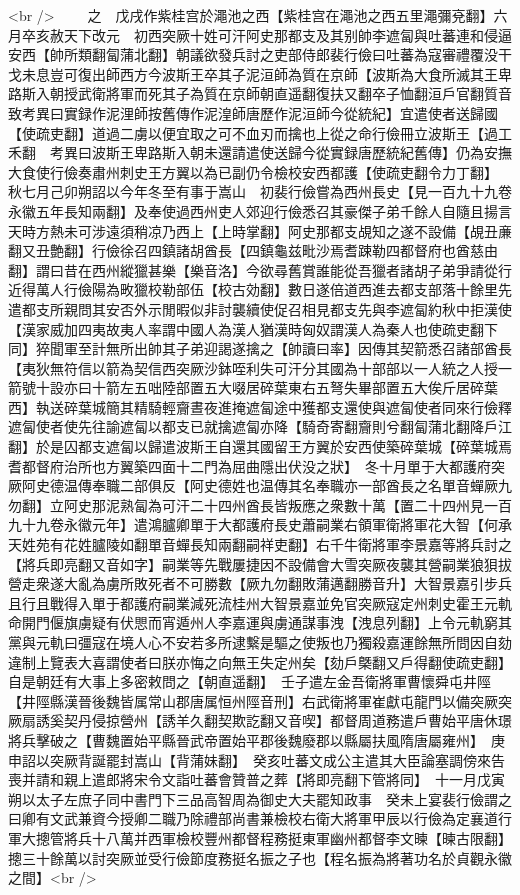 <br />
　　之　戊戌作紫桂宫於澠池之西【紫桂宫在澠池之西五里澠彌兗翻】六月卒亥赦天下改元　初西突厥十姓可汗阿史那都支及其别帥李遮匐與吐蕃連和侵逼安西【帥所類翻匐蒲北翻】朝議欲發兵討之吏部侍郎裴行儉曰吐蕃為寇審禮覆没干戈未息豈可復出師西方今波斯王卒其子泥洹師為質在京師【波斯為大食所滅其王卑路斯入朝授武衛將軍而死其子為質在京師朝直遥翻復扶又翻卒子恤翻洹戶官翻質音致考異曰實録作泥浬師按舊傳作泥湟師唐歷作泥洹師今從統紀】宜遣使者送歸國【使疏吏翻】道過二虜以便宜取之可不血刃而擒也上從之命行儉冊立波斯王【過工禾翻　考異曰波斯王卑路斯入朝未還請遣使送歸今從實録唐歷統紀舊傳】仍為安撫大食使行儉奏肅州刺史王方翼以為已副仍令檢校安西都護【使疏吏翻令力丁翻】　秋七月己卯朔詔以今年冬至有事于嵩山　初裴行儉嘗為西州長史【見一百九十九卷永徽五年長知兩翻】及奉使過西州吏人郊迎行儉悉召其豪傑子弟千餘人自隨且揚言天時方熱未可涉遠須稍凉乃西上【上時掌翻】阿史那都支覘知之遂不設備【覘丑亷翻又丑艶翻】行儉徐召四鎮諸胡酋長【四鎮龜兹毗沙焉耆踈勒四都督府也酋慈由翻】謂曰昔在西州縱獵甚樂【樂音洛】今欲尋舊賞誰能從吾獵者諸胡子弟爭請從行近得萬人行儉陽為畋獵校勒部伍【校古効翻】數日遂倍道西進去都支部落十餘里先遣都支所親問其安否外示閒暇似非討襲續使促召相見都支先與李遮匐約秋中拒漢使【漢家威加四夷故夷人率謂中國人為漢人猶漢時匈奴謂漢人為秦人也使疏吏翻下同】猝聞軍至計無所出帥其子弟迎謁遂擒之【帥讀曰率】因傳其契箭悉召諸部酋長【夷狄無符信以箭為契信西突厥沙鉢咥利失可汗分其國為十部部以一人統之人授一箭號十設亦曰十箭左五咄陸部置五大啜居碎葉東右五弩失畢部置五大俟斤居碎葉西】執送碎葉城簡其精騎輕齎晝夜進掩遮匐途中獲都支還使與遮匐使者同來行儉釋遮匐使者使先往諭遮匐以都支已就擒遮匐亦降【騎奇寄翻齎則兮翻匐蒲北翻降戶江翻】於是囚都支遮匐以歸遣波斯王自還其國留王方翼於安西使築碎葉城【碎葉城焉耆都督府治所也方翼築四面十二門為屈曲隱出伏没之狀】　冬十月單于大都護府突厥阿史德温傳奉職二部俱反【阿史德姓也温傳其名奉職亦一部酋長之名單音蟬厥九勿翻】立阿史那泥熟匐為可汗二十四州酋長皆叛應之衆數十萬【置二十四州見一百九十九卷永徽元年】遣鴻臚卿單于大都護府長史蕭嗣業右領軍衛將軍花大智【何承天姓苑有花姓臚陵如翻單音蟬長知兩翻嗣祥吏翻】右千牛衛將軍李景嘉等將兵討之【將兵即亮翻又音如字】嗣業等先戰屢捷因不設備會大雪突厥夜襲其營嗣業狼狽拔營走衆遂大亂為虜所敗死者不可勝數【厥九勿翻敗蒲邁翻勝音升】大智景嘉引步兵且行且戰得入單于都護府嗣業減死流桂州大智景嘉並免官突厥寇定州刺史霍王元軌命開門偃旗虜疑有伏愳而宵遁州人李嘉運與虜通謀事洩【洩息列翻】上令元軌窮其黨與元軌曰彊寇在境人心不安若多所逮繫是驅之使叛也乃獨殺嘉運餘無所問因自劾違制上覽表大喜謂使者曰朕亦悔之向無王失定州矣【劾戶槩翻又戶得翻使疏吏翻】自是朝廷有大事上多密敕問之【朝直遥翻】　壬子遣左金吾衛將軍曹懷舜屯井陘【井陘縣漢晉後魏皆属常山郡唐属恒州陘音刑】右武衛將軍崔獻屯龍門以備突厥突厥扇誘奚契丹侵掠營州【誘羊久翻契欺訖翻又音喫】都督周道務遣戶曹始平唐休璟將兵擊破之【曹魏置始平縣晉武帝置始平郡後魏廢郡以縣屬扶風隋唐屬雍州】　庚申詔以突厥背誕罷封嵩山【背蒲妹翻】　癸亥吐蕃文成公主遣其大臣論塞調傍來告喪并請和親上遣郎將宋令文詣吐蕃會贊普之葬【將即亮翻下管將同】　十一月戊寅朔以太子左庶子同中書門下三品高智周為御史大夫罷知政事　癸未上宴裴行儉謂之曰卿有文武兼資今授卿二職乃除禮部尚書兼檢校右衛大將軍甲辰以行儉為定襄道行軍大摠管將兵十八萬并西軍檢校豐州都督程務挺東軍幽州都督李文暕【暕古限翻】摠三十餘萬以討突厥並受行儉節度務挺名振之子也【程名振為將著功名於貞觀永徽之間】<br />

